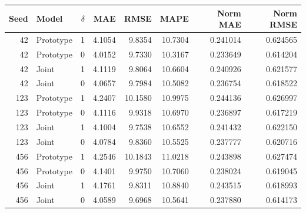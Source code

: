\begingroup\color{revisionblue}
\sffamily\fontsize{9}{11}\selectfont\renewcommand{\arraystretch}{1.08}\setlength{\tabcolsep}{3pt}
\begin{tabular}{rlrrrrrr}

\toprule
Seed & Model & $\delta$ & MAE & RMSE & MAPE & Norm MAE & Norm RMSE \\
\midrule

42 & Prototype & 1 & 4.1054 & 9.8354 & 10.7304 & 0.241014 & 0.624565 \\

42 & Prototype & 0 & 4.0152 & 9.7330 & 10.3167 & 0.233649 & 0.614204 \\

42 & Joint & 1 & 4.1119 & 9.8064 & 10.6604 & 0.240926 & 0.621577 \\

42 & Joint & 0 & 4.0657 & 9.7984 & 10.5082 & 0.236754 & 0.618522 \\

123 & Prototype & 1 & 4.2407 & 10.1580 & 10.9975 & 0.244136 & 0.626997 \\

123 & Prototype & 0 & 4.1116 & 9.9318 & 10.6970 & 0.236897 & 0.617219 \\

123 & Joint & 1 & 4.1004 & 9.7538 & 10.6552 & 0.241432 & 0.622150 \\

123 & Joint & 0 & 4.0784 & 9.8360 & 10.5525 & 0.237777 & 0.620716 \\

456 & Prototype & 1 & 4.2546 & 10.1843 & 11.0218 & 0.243898 & 0.627474 \\

456 & Prototype & 0 & 4.1401 & 9.9750 & 10.7060 & 0.238024 & 0.619045 \\

456 & Joint & 1 & 4.1761 & 9.8311 & 10.8840 & 0.243515 & 0.618993 \\

456 & Joint & 0 & 4.0589 & 9.6968 & 10.5641 & 0.237880 & 0.614173 \\

\bottomrule
\end{tabular}
\endgroup
